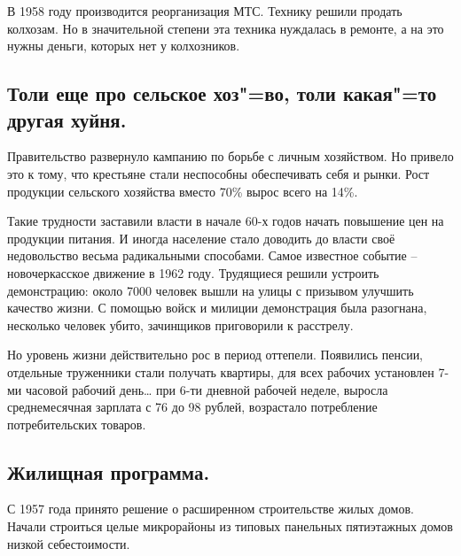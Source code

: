 В 1958 году производится реорганизация МТС. Технику решили продать колхозам. Но в значительной степени эта техника нуждалась в ремонте, а на это нужны деньги, которых нет у колхозников.

\subsection{Толи еще про сельское хоз"=во, толи какая"=то другая хуйня.}

Правительство развернуло кампанию по борьбе с личным хозяйством. Но привело это к тому, что крестьяне стали неспособны обеспечивать себя и рынки. Рост продукции сельского хозяйства вместо 70\% вырос всего на 14\%.

Такие трудности заставили власти в начале 60-х годов начать повышение цен на продукции питания. И иногда население стало доводить до власти своё недовольство весьма радикальными способами. Самое известное событие – новочеркасское движение в 1962 году. Трудящиеся решили устроить демонстрацию: около 7000 человек вышли на улицы с призывом улучшить качество жизни. С помощью войск и милиции демонстрация была разогнана, несколько человек убито, зачинщиков приговорили к расстрелу.

Но уровень жизни действительно рос в период оттепели. Появились пенсии, отдельные труженники стали получать квартиры, для всех рабочих установлен 7-ми часовой рабочий день… при 6-ти дневной рабочей неделе, выросла среднемесячная зарплата с 76 до 98 рублей, возрастало потребление потребительских товаров.

\subsection{Жилищная программа.}

С 1957 года принято решение о расширенном строительстве жилых домов. Начали строиться целые микрорайоны из типовых панельных пятиэтажных домов низкой себестоимости.

